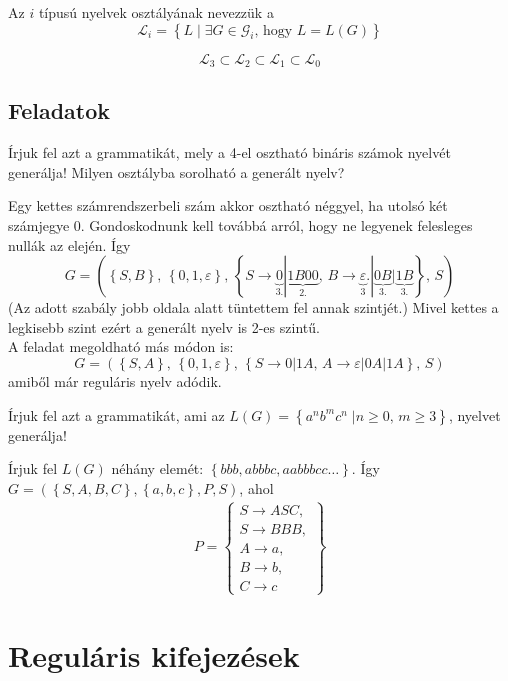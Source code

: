 \begin{definition*}[nyelvosztály]
	Az $i$ típusú nyelvek osztályának nevezzük a 
	\[
	\mathcal{L}_i = \left\lbrace L \; | \; \exists G \in \mathcal{G}_i \text{, hogy } L = L(G) \right\rbrace 
	\]
\end{definition*}

\begin{theorem}
	\[
		\mathcal{L}_3 \subset \mathcal{L}_2 \subset \mathcal{L}_1 \subset \mathcal{L}_0
	\]
\end{theorem}

\subsection{Feladatok}
\setcounter{exercise}{0}
\begin{exercise}
	Írjuk fel azt a grammatikát, mely a 4-el osztható bináris számok nyelvét generálja! Milyen osztályba sorolható a generált nyelv?
\end{exercise}

\begin{solution}
	Egy kettes számrendszerbeli szám akkor osztható néggyel, ha utolsó két számjegye 0. Gondoskodnunk kell továbbá arról, hogy ne legyenek felesleges nullák az elején. Így
	\[
	G = \left( \left\lbrace S, B \right\rbrace, \, \left\lbrace 0,1, \varepsilon \right\rbrace, \, \left\lbrace  S \rightarrow \underbrace{0}_{3.} | \underbrace{1B00}_{2.}, \,  B \rightarrow \underbrace{\varepsilon}_3.|\underbrace{0B}_{3.}|\underbrace{1B}_{3.} \right\rbrace , \, S \right)
	\]
	(Az adott szabály jobb oldala alatt tüntettem fel annak szintjét.) Mivel kettes a legkisebb szint ezért a generált nyelv is 2-es szintű.
	\\[4pt]
	A feladat megoldható más módon is:
	\[
	G = \left( \left\lbrace S, A \right\rbrace, \, \left\lbrace 0,1, \varepsilon \right\rbrace, \, \left\lbrace  S \rightarrow 0 | 1A, \,  A \rightarrow \varepsilon|0A|1A \right\rbrace , \, S \right)
	\]
	amiből már reguláris nyelv adódik.
\end{solution}

\begin{exercise}
	Írjuk fel azt a grammatikát, ami az $ L(G) = \left\lbrace a^n b^m c^n \; | n \ge 0, \, m \ge 3 \right\rbrace  $, nyelvet generálja!
\end{exercise}
\begin{solution}
	Írjuk fel $L(G)$ néhány elemét: $ \left\lbrace bbb, abbbc, aabbbcc \dots \right\rbrace $. Így $ G = (\left\lbrace  S,A,B,C \right\rbrace , \left\lbrace a,b,c \right\rbrace, P, S) $, ahol
	\begin{align*}
		P = \left\lbrace \begin{array}{l}
			S \rightarrow ASC, \\
			S \rightarrow BBB, \\
			A \rightarrow a, \\
			B \rightarrow b, \\
			C \rightarrow c
		\end{array} \right\rbrace 
	\end{align*}
\end{solution}

\section{Reguláris kifejezések}